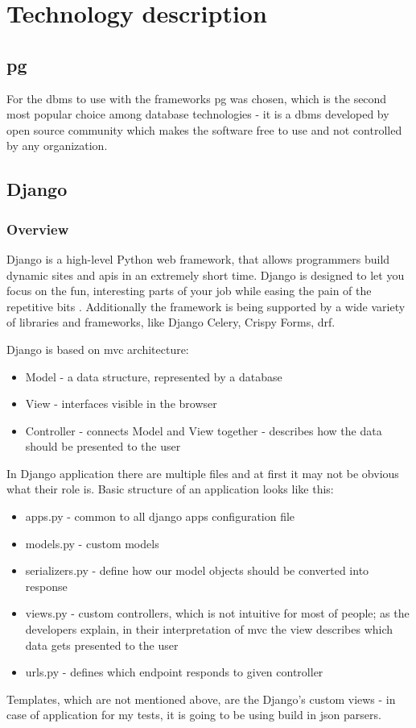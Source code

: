 
\chapter{Technology description}


\section{\acrlong{pg}}

For the \acrlong{dbms} to use with the frameworks \acrlong{pg} was chosen, which is the second most popular choice among database technologies \cite{devSurveyDb} - it is a \acrshort{dbms} developed by open source community which makes the software free to use and not controlled by any organization.

\section{Django}

\subsection{Overview}
Django is a high-level Python web framework, that allows programmers build dynamic sites and \acrshort{api}s in an extremely short time. Django is designed to let you focus on the fun, interesting parts of your job while easing the pain of the repetitive bits \cite{djangobook}. Additionally the framework is being supported by a wide variety of libraries and frameworks, like Django Celery, Crispy Forms, \acrfull{drf}.

Django is based on \acrshort{mvc} architecture:
\begin{itemize}
  \item Model - a data structure, represented by a database
  \item View - interfaces visible in the browser
  \item Controller - connects Model and View together - describes how the data should be presented to the user
\end{itemize}
In Django application there are multiple files and at first it may not be obvious what their role is. Basic structure of an application looks like this:
\begin{itemize}
  \item apps.py - common to all django apps configuration file
  \item models.py - custom models
  \item serializers.py - define how our model objects should be converted into response
  \item views.py - custom controllers, which is not intuitive for most of people; as the developers explain, in their interpretation of \acrshort{mvc} the view describes which data gets presented to the user \cite{djangoWhyViews}
  \item urls.py - defines which endpoint responds to given controller
\end{itemize}
Templates, which are not mentioned above, are the Django's custom views - in case of application for my tests, it is going to be using build in \acrshort{json} parsers.

